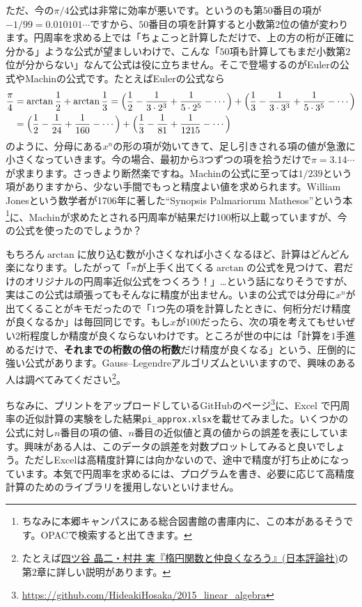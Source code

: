 ただ、今の$\pi/4$公式は非常に効率が悪いです。というのも第$50$番目の項が$-1/99 = 0.010101\cdots$ですから、$50$番目の項を計算すると小数第$2$位の値が変わります。円周率を求める上では「ちょこっと計算しただけで、上の方の桁が正確に分かる」ような公式が望ましいわけで、こんな「$50$項も計算してもまだ小数第$2$位が分からない」なんて公式は役に立ちません。そこで登場するのがEulerの公式やMachinの公式です。たとえばEulerの公式なら
\begin{align*}
\frac{\pi}{4}
&= \arctan \frac{1}{2} + \arctan \frac{1}{3}
= \Bigl(\frac{1}{2} - \frac{1}{3\cdot 2^3} + \frac{1}{5\cdot 2^5} - \cdots\Bigr)
+ \Bigl(\frac{1}{3} - \frac{1}{3\cdot 3^3} + \frac{1}{5\cdot 3^5} - \cdots\Bigr) \\
&= \Bigl(\frac{1}{2} - \frac{1}{24} + \frac{1}{160} - \cdots\Bigr)
+ \Bigl(\frac{1}{3} - \frac{1}{81} + \frac{1}{1215} - \cdots\Bigr)
\end{align*}
のように、分母にある$x^n$の形の項が効いてきて、足し引きされる項の値が急激に小さくなっていきます。今の場合、最初から$3$つずつの項を拾うだけで$\pi=3.14\cdots$が求まります。さっきより断然楽ですね。Machinの公式に至っては$1/239$という項がありますから、少ない手間でもっと精度よい値を求められます。William Jonesという数学者が1706年に著した``Synopsis Palmariorum Mathesos''という本\footnote{ちなみに本郷キャンパスにある総合図書館の書庫内に、この本があるそうです。OPACで検索すると出てきます。}に、Machinが求めたとされる円周率が結果だけ100桁以上載っていますが、今の公式を使ったのでしょうか？

もちろん$\arctan$に放り込む数が小さくなれば小さくなるほど、計算はどんどん楽になります。したがって「$\pi$が上手く出てくる$\arctan$の公式を見つけて、君だけのオリジナルの円周率近似公式をつくろう！」…という話になりそうですが、実はこの公式は頑張ってもそんなに精度が出ません。いまの公式では分母に$x^n$が出てくることがキモだったので「$1$つ先の項を計算したときに、何桁分だけ精度が良くなるか」は毎回同じです。もし$x$が$100$だったら、次の項を考えてもせいぜい$2$桁程度しか精度が良くならないわけです。ところが世の中には「計算を$1$手進めるだけで、\textbf{それまでの桁数の倍の桁数}だけ精度が良くなる」という、圧倒的に強い公式があります。Gauss--Legendreアルゴリズムといいますので、興味のある人は調べてみてください\footnote{たとえば\href{http://www.nippyo.co.jp/book/6387.html}{四ツ谷 晶二・村井 実『楕円関数と仲良くなろう』(日本評論社)}の第$2$章に詳しい説明があります。}。

ちなみに、プリントをアップロードしているGitHubのページ\footnote{\url{https://github.com/HideakiHosaka/2015_linear_algebra}}に、Excel で円周率の近似計算の実験をした結果\texttt{pi\_approx.xlsx}を載せてみました。いくつかの公式に対し$n$番目の項の値、$n$番目の近似値と真の値からの誤差を表にしています。興味がある人は、このデータの誤差を対数プロットしてみると良いでしょう。ただしExcelは高精度計算には向かないので、途中で精度が打ち止めになっています。本気で円周率を求めるには、プログラムを書き、必要に応じて高精度計算のためのライブラリを援用しないといけません。

